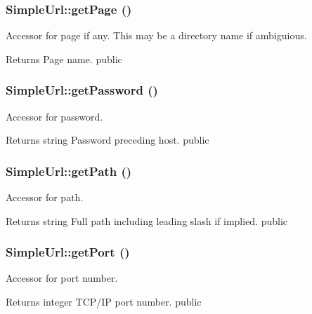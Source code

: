 \hypertarget{class_simple_url_aace12f22a6a7b394d85394d353b8153a}{
\subsubsection[{getPage}]{\setlength{\rightskip}{0pt plus 5cm}SimpleUrl::getPage ()}}
\label{class_simple_url_aace12f22a6a7b394d85394d353b8153a}
Accessor for page if any. This may be a directory name if ambiguious. \begin{DoxyReturn}{Returns}
Page name.  public 
\end{DoxyReturn}
\hypertarget{class_simple_url_a84492f83d2c450cb1aa3fcb257817ec9}{
\subsubsection[{getPassword}]{\setlength{\rightskip}{0pt plus 5cm}SimpleUrl::getPassword ()}}
\label{class_simple_url_a84492f83d2c450cb1aa3fcb257817ec9}
Accessor for password. \begin{DoxyReturn}{Returns}
string Password preceding host.  public 
\end{DoxyReturn}
\hypertarget{class_simple_url_a21ef0d5146b74d581769e4ea7d448316}{
\subsubsection[{getPath}]{\setlength{\rightskip}{0pt plus 5cm}SimpleUrl::getPath ()}}
\label{class_simple_url_a21ef0d5146b74d581769e4ea7d448316}
Accessor for path. \begin{DoxyReturn}{Returns}
string Full path including leading slash if implied.  public 
\end{DoxyReturn}
\hypertarget{class_simple_url_a5cdd0c001a318e2ea58babbf530c5fa1}{
\subsubsection[{getPort}]{\setlength{\rightskip}{0pt plus 5cm}SimpleUrl::getPort ()}}
\label{class_simple_url_a5cdd0c001a318e2ea58babbf530c5fa1}
Accessor for port number. \begin{DoxyReturn}{Returns}
integer TCP/IP port number.  public 
\end{DoxyReturn}
